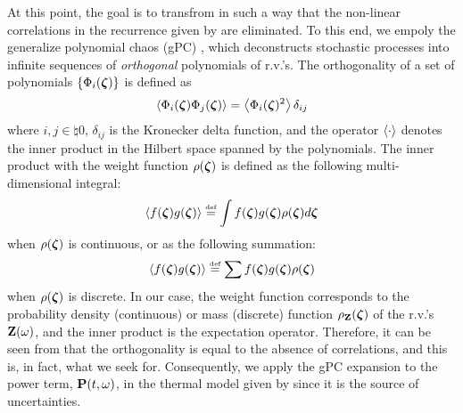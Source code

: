 At this point, the goal is to transfrom  in such a way that the non-linear correlations in the recurrence given by  are eliminated. To this end, we empoly the generalize polynomial chaos (gPC) \cite{xiu2002}, which deconstructs stochastic processes into infinite sequences of \emph{orthogonal} polynomials of r.v.'s. The orthogonality of a set of polynomials $\{ \Phi_i(\boldsymbol{\zeta}) \}$ is defined as
\begin{equation} \elabel{orthogonality}
  \oInner{\pcb_i(\vz) \pcb_j(\vz)} = \oInner{\pcb_i(\vz)^2} \delta_{ij}
\end{equation}
where $i,j \in \natural{0}$, $\delta_{ij}$ is the Kronecker delta function, and the operator $\left\langle \cdot \right\rangle$ denotes the inner product in the Hilbert space spanned by the polynomials. The inner product with the weight function $\rho(\boldsymbol{\zeta})$ is defined as the following multi-dimensional integral:
\begin{equation} \elabel{inner-product-integral}
  \oInner{f(\vz) g(\vz)} \eqdef \int f(\vz) g(\vz) \pdf(\vz) d\vz
\end{equation}
when $\rho(\boldsymbol{\zeta})$ is continuous, or as the following summation:
\begin{equation} \elabel{inner-product-sum}
  \oInner{f(\vz) g(\vz)} \eqdef \sum f(\vz) g(\vz) \pdf(\vz)
\end{equation}
when $\rho(\boldsymbol{\zeta})$ is discrete. In our case, the weight function corresponds to the probability density (continuous) or mass (discrete) function $\rho_{\mathbf{Z}}(\boldsymbol{\zeta})$ of the r.v.'s $\mathbf{Z}(\omega)$, and the inner product is the expectation operator. Therefore, it can be seen from  that the orthogonality is equal to the absence of correlations, and this is, in fact, what we seek for. Consequently, we apply the gPC expansion to the power term, $\mathbf{P}(t, \omega)$, in the thermal model given by  since it is the source of uncertainties.


